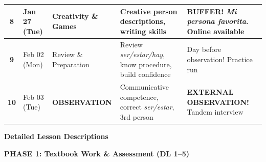 \documentclass[11pt, a4paper]{article}
\newcommand{\es}[1]{\textcolor{spanisch}{\textit{#1}}}
\begin{document}
\begin{longtable}{|c|p{2.2cm}|p{3.5cm}|p{4cm}|p{4cm}|}
\rowcolor{purple!10}
\textbf{8} & Jan 27 (Tue) & \textcolor{puffer}{Creativity \& Games} &
Creative person descriptions, writing skills &
\textcolor{puffer}{\textbf{BUFFER!}} \es{Mi persona favorita}. Online available \\
\hline

\textbf{9} & Feb 02 (Mon) & Review \& Preparation &
Review \es{ser/estar/hay}, know procedure, build confidence &
Day before observation! Practice run \\
\hline

\rowcolor{red!15}
\textbf{10} & Feb 03 (Tue) & \textbf{OBSERVATION} &
Communicative competence, correct \es{ser/estar}, 3rd person &
\textcolor{beobachtung}{\textbf{EXTERNAL OBSERVATION!}} Tandem interview \\
\hline

\end{longtable}

\normalsize
\renewcommand{\arraystretch}{1.0}

\vspace{0.3cm}


{\large\bfseries\color{spanisch} Detailed Lesson Descriptions}

\vspace{0.3cm}

\textbf{\color{spanisch} PHASE 1: Textbook Work \& Assessment (DL 1--5)}

\vspace{0.2cm}
\end{document}
